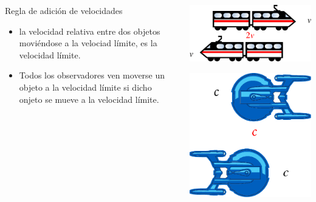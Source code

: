 \documentclass[%
xcolor=pdftex,dvipsnames,table%
]{beamer}
\begin{document}
\begin{frame}
  \begin{columns}
    \begin{column}{0.5\linewidth}
        \begin{block}{Regla de adición de velocidades}
    \begin{itemize}
    \item  la velocidad relativa entre dos objetos moviéndose a la velociad límite,  es la velocidad límite.
    \item Todos los observadores ven moverse un objeto a la velocidad límite si dicho onjeto se mueve a la velocidad límite. 
    \end{itemize}
  \end{block}
    \end{column}
    \begin{column}{0.6\linewidth}
      \includegraphics[scale=0.7]{train}

\hrulefill{}

\vspace{1cm}

      \includegraphics[scale=0.5]{Enterprise}

    \end{column}
  \end{columns}
\end{frame}
\end{document}
